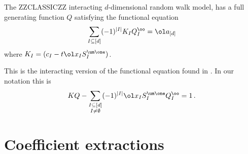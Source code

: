 \begin{theorem} The ZZCLASSICZZ interacting $d$-dimensional random walk model, has a full generating function $Q$ satisfying the functional equation
\begin{align}
   \sum_{I\subseteq [d]}(-1)^{|I|} K_I Q_I^\oo= \ol a_{[d]}
\end{align}
where $K_I = (c_I-t \ol x_I S_{I}^{\um \one})$.
\end{theorem}
This is the interacting version of the functional equation found in \cite{melczer2014variants}. In our notation this is
\begin{align}
	KQ - \sum_{\substack{I \subseteq [d]\\ I \neq \emptyset}}(-1)^{|I|}\ol x_IS_I^{\um \one}Q_I^{\oo} = 1\,.
\end{align}


\section{Coefficient extractions}
